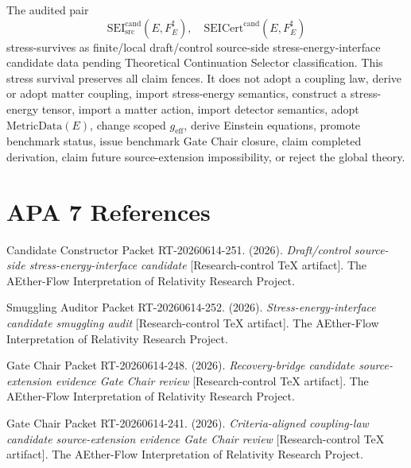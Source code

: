 \documentclass[11pt]{article}
\newcommand{\MetricData}{\mathrm{MetricData}}
\newcommand{\geff}{g_{\mathrm{eff}}}
\newcommand{\SEICand}{\mathrm{SEI}_{\mathrm{src}}^{\mathrm{cand}}}
\newcommand{\SEICertCand}{\mathrm{SEICert}^{\mathrm{cand}}}
\begin{document}
The audited pair
\[
  \SEICand(E,F_E^\sharp),\quad \SEICertCand(E,F_E^\sharp)
\]
stress-survives as finite/local draft/control source-side
stress-energy-interface candidate data pending Theoretical Continuation
Selector classification. This stress survival preserves all claim fences. It
does not adopt a coupling law, derive or adopt matter coupling, import
stress-energy semantics, construct a stress-energy tensor, import a matter
action, import detector semantics, adopt \(\MetricData(E)\), change scoped
\(\geff\), derive Einstein equations, promote benchmark status, issue
benchmark Gate Chair closure, claim completed derivation, claim future
source-extension impossibility, or reject the global theory.

\section{APA 7 References}

Candidate Constructor Packet RT-20260614-251. (2026). \emph{Draft/control
source-side stress-energy-interface candidate} [Research-control TeX
artifact]. The AEther-Flow Interpretation of Relativity Research Project.

Smuggling Auditor Packet RT-20260614-252. (2026). \emph{Stress-energy-interface
candidate smuggling audit} [Research-control TeX artifact]. The AEther-Flow
Interpretation of Relativity Research Project.

Gate Chair Packet RT-20260614-248. (2026). \emph{Recovery-bridge candidate
source-extension evidence Gate Chair review} [Research-control TeX artifact].
The AEther-Flow Interpretation of Relativity Research Project.

Gate Chair Packet RT-20260614-241. (2026). \emph{Criteria-aligned
coupling-law candidate source-extension evidence Gate Chair review}
[Research-control TeX artifact]. The AEther-Flow Interpretation of Relativity
Research Project.
\end{document}

